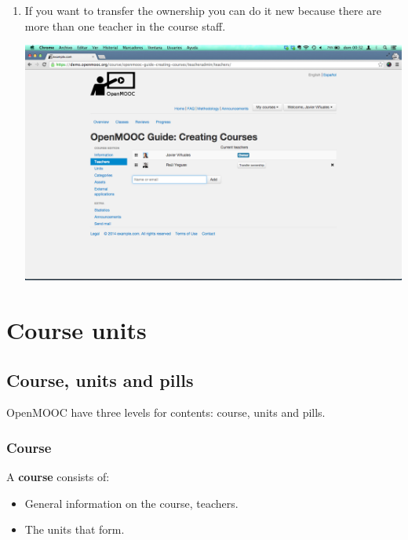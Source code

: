 \documentclass[letterpaper,10pt,english]{sphinxmanual}
\begin{document}
\begin{enumerate}
\item {} 
If you want to transfer the ownership you can do it new because there are more than one teacher in the course staff.

\includegraphics{3_course_teachers-4.png}

\end{enumerate}


\chapter{Course units}
\label{course_units:course-units}\label{course_units::doc}\label{course_units:id1}

\section{Course, units and pills}
\label{course_units:course-units-and-pills}
OpenMOOC have three levels for contents: course, units and pills.


\subsection{Course}
\label{course_units:course}
A \textbf{course} consists of:
\begin{itemize}
\item {} 
General information on the course, teachers.

\item {} 
The units that form.

\end{itemize}
\end{document}
